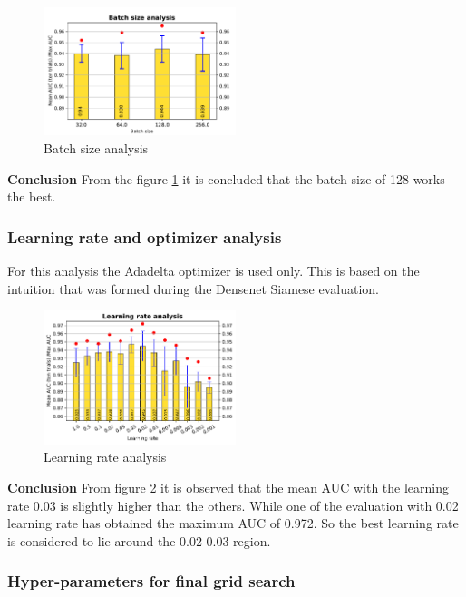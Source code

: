 \begin{figure}[ht]
\centering
\includegraphics[width=0.5\textwidth]{images/densenet/simple/densenet_simple_batchsize}
\caption{\label{fig:densenet_simple_batchsize}Batch size analysis}
\end{figure}
  
\textbf{Conclusion}
From the figure \ref{fig:densenet_simple_batchsize} it is concluded that the batch size of 128 works the best. 
\flushbottom
\newpage

\subsubsection{Learning rate and optimizer analysis}
For this analysis the Adadelta optimizer is used only. This is based on the intuition that was formed during the Densenet Siamese evaluation.

\begin{figure}[ht]
\centering
\includegraphics[width=0.5\textwidth]{images/densenet/simple/densenet_simple_learning_rate}
\caption{\label{fig:densenet_simple_learning_rate}Learning rate analysis}
\end{figure}

\textbf{Conclusion} 
From figure \ref{fig:densenet_simple_learning_rate} it is observed that the mean AUC with the learning rate 0.03 is slightly higher than the others. While one of the evaluation with 0.02 learning rate has 
obtained the maximum AUC of 0.972. So the best learning rate is considered to lie around the 0.02-0.03 region.


\subsubsection{Hyper-parameters for final grid search}

